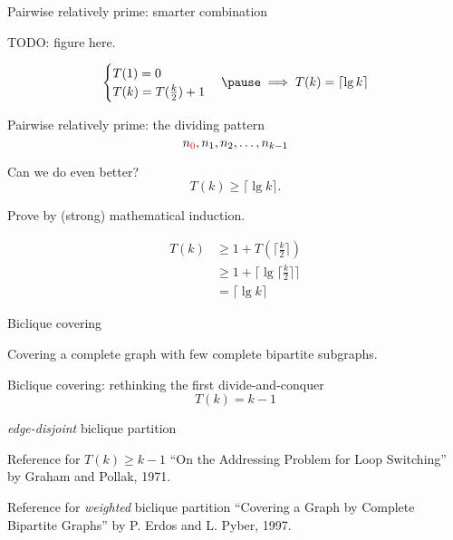 \begin{frame}{Pairwise relatively prime: smarter combination}
  \centerline{TODO: figure here.}

  \begin{equation*}
	\begin{cases}
	  T(1) = 0 \\
	  T(k) = T(\frac{k}{2}) + 1
	\end{cases}\pause \implies T(k) = \lceil \lg k \rceil
  \end{equation*}
\end{frame}
\begin{frame}{Pairwise relatively prime: the dividing pattern}
  \[
	n_{\textcolor{red}{0}}, n_1, n_2, \ldots, n_{k-1}
  \]
\end{frame}
\begin{frame}{Can we do even better?}
  \[
	T(k) \ge \lceil \lg k \rceil.
  \]

  \pause
  \centerline{Prove by (strong) mathematical induction.}

  \pause
  \begin{align*}
	T(k) &\ge 1 + T(\lceil \frac{k}{2} \rceil) \\
		&\ge 1 + \lceil \lg \lceil \frac{k}{2} \rceil \rceil \\
		&= \lceil \lg k \rceil
  \end{align*}
\end{frame}
\begin{frame}{Biclique covering}
  \centerline{Covering a complete graph with few complete bipartite subgraphs.}

\end{frame}
\begin{frame}{Biclique covering: rethinking the first divide-and-conquer}
  \[
	T(k) = k-1
  \]

  \pause
  \centerline{\emph{edge-disjoint} biclique partition}

  \pause
  \vspace{0.20cm}
  \begin{alertblock}{Reference for $T(k) \ge k-1$}
	``On the Addressing Problem for Loop Switching'' by Graham and Pollak, 1971. 
  \end{alertblock}

  \pause
  \vspace{0.30cm}
  \begin{alertblock}{Reference for \emph{weighted} biclique partition}
	``Covering a Graph by Complete Bipartite Graphs'' by P. Erdos and L. Pyber, 1997.
  \end{alertblock}
\end{frame}
